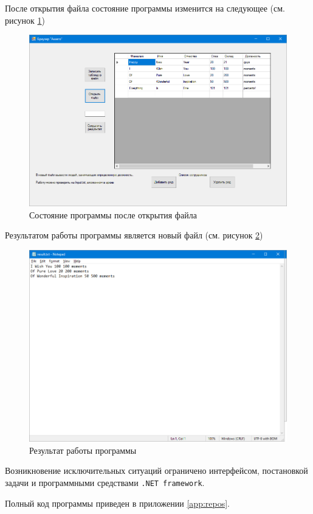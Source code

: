 После открытия файла состояние программы изменится на следующее (см. рисунок \ref{fig:openFile})
\begin{figure}[H]
    \centering
    \includegraphics[scale=0.4]{task8/openFile.png}
    \caption{Состояние программы после открытия файла}
    \label{fig:openFile}
\end{figure}

Результатом работы программы является новый файл (см. рисунок \ref{fig:result8})
\begin{figure}[H]
    \centering
    \includegraphics[scale=0.4]{task8/result.png}
    \caption{Результат работы программы}
    \label{fig:result8}
\end{figure}
Возникновение исключительных ситуаций ограничено интерфейсом, постановкой задачи
и программными средствами \verb|.NET framework|.

Полный код программы приведен в приложении \ref{app:repos}.

